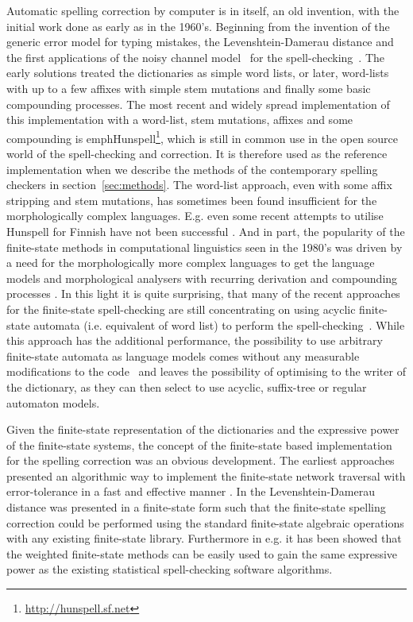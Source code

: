 \documentclass[a4paper,12pt]{article}
\begin{document}
Automatic spelling correction by computer is in itself, an old invention, with
the initial work done as early as in the 1960's. Beginning from the invention
of the generic error model for typing mistakes, the Levenshtein-Damerau
distance \cite[]{levenshtein/1966,damerau/1964} and the first applications of
the noisy channel model~\cite[]{shannon/1948} for the
spell-checking~\cite[]{raviv/1967}.  The early solutions treated the
dictionaries as simple word lists, or later, word-lists with up to a few
affixes with simple stem mutations and finally some basic compounding
processes. The most recent and widely spread implementation of this
implementation with a word-list, stem mutations, affixes and some compounding
is emph{Hunspell}\footnote{\url{http://hunspell.sf.net}}, which is still in
common use in the open source world of the spell-checking and correction.  It
is therefore used as the reference implementation when we describe the methods
of the contemporary spelling checkers in section~\ref{sec:methods}. The
word-list approach, even with some affix stripping and stem mutations, has
sometimes been found insufficient for the morphologically complex languages.
E.g. even some recent attempts to utilise Hunspell for Finnish have not been
successful \cite[]{pitkanen/2006}. And in part, the popularity of the
finite-state methods in computational linguistics seen in the 1980's was driven
by a need for the morphologically more complex languages to get the language
models and morphological analysers with recurring derivation and compounding
processes \cite[]{beesley2004morphological}.  In this light it is quite
surprising, that many of the recent approaches for the finite-state
spell-checking are still concentrating on using acyclic finite-state automata
(i.e. equivalent of word list) to perform the
spell-checking~\cite[]{watson2003new,deorowicz2005correcting}. While this
approach has the additional performance, the possibility to use arbitrary
finite-state automata as language models comes without any measurable
modifications to the code~\cite[e.g.][]{pirinen/2010/lrec} and leaves the
possibility of optimising to the writer of the dictionary, as they can then
select to use acyclic, suffix-tree or regular automaton models.

Given the  finite-state representation of the dictionaries and the expressive
power of the finite-state systems, the concept of the finite-state based
implementation for the spelling correction was an obvious development. The
earliest approaches presented an algorithmic way to implement the finite-state
network traversal with error-tolerance \cite[]{oflazer/1996} in a fast and
effective manner \cite[]{agata/2002,hulden/2009}.  In \cite{schulz/2002} the
Levenshtein-Damerau distance was presented in a finite-state form such that the
finite-state spelling correction could be performed using the standard
finite-state algebraic operations with any existing finite-state library.
Furthermore in e.g.  \cite{pirinen/2010/lrec} it has been showed that the
weighted finite-state methods can be easily used to gain the same expressive
power as the existing statistical spell-checking software algorithms.
\end{document}
